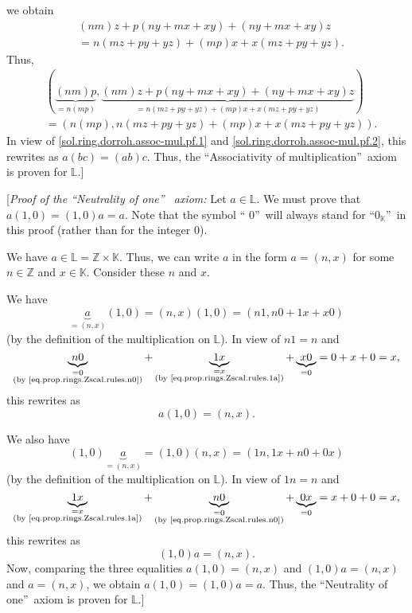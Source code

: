 \documentclass[paper=a4, fontsize=12pt]{scrartcl}%
\theoremstyle{plainsl}
\theoremstyle{definition}
\theoremstyle{remark}
\begin{document}
we obtain%
\begin{align*}
&  \left(  nm\right)  z+p\left(  ny+mx+xy\right)  +\left(  ny+mx+xy\right)
z\\
&  =n\left(  mz+py+yz\right)  +\left(  mp\right)  x+x\left(  mz+py+yz\right)
.
\end{align*}
Thus,%
\begin{align*}
&  \left(  \underbrace{\left(  nm\right)  p}_{=n\left(  mp\right)
},\underbrace{\left(  nm\right)  z+p\left(  ny+mx+xy\right)  +\left(
ny+mx+xy\right)  z}_{=n\left(  mz+py+yz\right)  +\left(  mp\right)  x+x\left(
mz+py+yz\right)  }\right) \\
&  =\left(  n\left(  mp\right)  ,n\left(  mz+py+yz\right)  +\left(  mp\right)
x+x\left(  mz+py+yz\right)  \right)  .
\end{align*}
In view of \eqref{sol.ring.dorroh.assoc-mul.pf.1} and
\eqref{sol.ring.dorroh.assoc-mul.pf.2}, this rewrites as $a\left(  bc\right)
=\left(  ab\right)  c$. Thus, the \textquotedblleft Associativity of
multiplication\textquotedblright\ axiom is proven for $\mathbb{L}$.]

[\textit{Proof of the \textquotedblleft Neutrality of one\textquotedblright%
\ axiom:} Let $a\in\mathbb{L}$. We must prove that $a\left(  1,0\right)
=\left(  1,0\right)  a=a$. Note that the symbol \textquotedblleft%
$0$\textquotedblright\ will always stand for \textquotedblleft$0_{\mathbb{K}}%
$\textquotedblright\ in this proof (rather than for the integer $0$).

We have $a\in\mathbb{L}=\mathbb{Z}\times\mathbb{K}$. Thus, we can write $a$ in
the form $a=\left(  n,x\right)  $ for some $n\in\mathbb{Z}$ and $x\in
\mathbb{K}$. Consider these $n$ and $x$.

We have
\[
\underbrace{a}_{=\left(  n,x\right)  }\left(  1,0\right)  =\left(  n,x\right)
\left(  1,0\right)  =\left(  n1,n0+1x+x0\right)
\]
(by the definition of the multiplication on $\mathbb{L}$). In view of $n1=n$
and
\[
\underbrace{n0}_{\substack{=0\\\text{(by
\eqref{eq.prop.rings.Zscal.rules.n0})}}}+\underbrace{1x}%
_{\substack{=x\\\text{(by \eqref{eq.prop.rings.Zscal.rules.1a})}%
}}+\underbrace{x0}_{=0}=0+x+0=x,
\]
this rewrites as
\[
a\left(  1,0\right)  =\left(  n,x\right)  .
\]


We also have%
\[
\left(  1,0\right)  \underbrace{a}_{=\left(  n,x\right)  }=\left(  1,0\right)
\left(  n,x\right)  =\left(  1n,1x+n0+0x\right)
\]
(by the definition of the multiplication on $\mathbb{L}$). In view of $1n=n$
and
\[
\underbrace{1x}_{\substack{=x\\\text{(by
\eqref{eq.prop.rings.Zscal.rules.1a})}}}+\underbrace{n0}%
_{\substack{=0\\\text{(by \eqref{eq.prop.rings.Zscal.rules.n0})}%
}}+\underbrace{0x}_{=0}=x+0+0=x,
\]
this rewrites as
\[
\left(  1,0\right)  a=\left(  n,x\right)  .
\]
Now, comparing the three equalities $a\left(  1,0\right)  =\left(  n,x\right)
$ and $\left(  1,0\right)  a=\left(  n,x\right)  $ and $a=\left(  n,x\right)
$, we obtain $a\left(  1,0\right)  =\left(  1,0\right)  a=a$. Thus, the
\textquotedblleft Neutrality of one\textquotedblright\ axiom is proven for
$\mathbb{L}$.]
\end{document}

